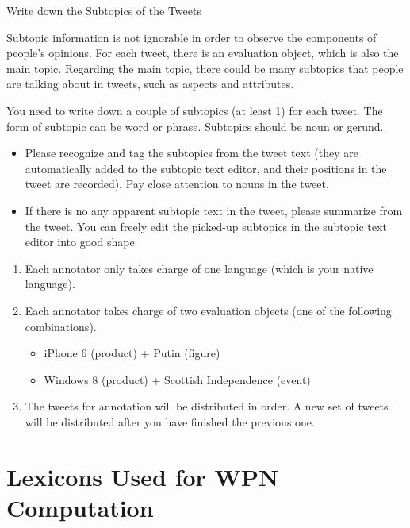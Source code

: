 \documentclass[english]{jnlp_1.4}
\begin{document}
\begin{enumerate}
	{\bf \item Write down the Subtopics of the Tweets}

	\noindent Subtopic information is not ignorable in order to observe the components of people's opinions. For each tweet, there is an evaluation object, which is also the main topic. Regarding the main topic, there could be many subtopics 			 that people are talking about in tweets, such as aspects and attributes.

\vspace{1\Cvs}
	\noindent You need to write down a couple of subtopics (at least 1) for each tweet. The form of subtopic can be word or phrase. Subtopics should be noun or gerund. 
	\begin{itemize}
		\item Please recognize and tag the subtopics from the tweet text (they are automatically added to the subtopic text editor, and their positions in the tweet are recorded). Pay close attention to nouns in the tweet.
		\item If there is no any apparent subtopic text in the tweet, please summarize from the tweet. You can freely edit the picked-up subtopics in the subtopic text editor into good shape.
	\end{itemize}
\end{enumerate}
\vspace{1\Cvs}
\begin{enumerate}
	\item Each annotator only takes charge of one language (which is your native language).
	\item Each annotator takes charge of two evaluation objects (one of the following combinations).
	\begin{itemize}
		\item iPhone 6 (product) + Putin (figure)
		\item Windows 8 (product) + Scottish Independence (event)
	\end{itemize}
	\item The tweets for annotation will be distributed in order. A new set of tweets will be distributed after you have finished the previous one.
\end{enumerate}


\section{Lexicons Used for WPN Computation}
\end{document}
